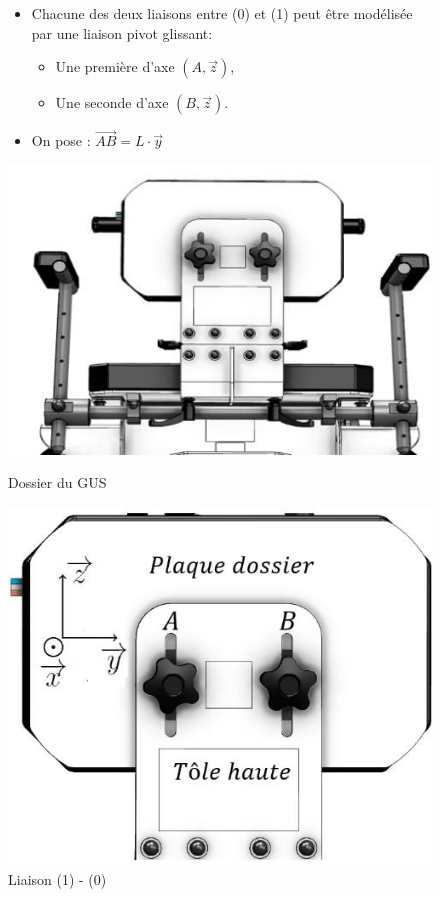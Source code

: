 \begin{figure}[ht!]
\begin{minipage}{0.55\linewidth}
\begin{itemize}
 \item Chacune des deux liaisons entre (0) et (1) peut être modélisée par une liaison pivot glissant:
 \begin{itemize}
  \item Une première d'axe $(A,\vec{z})$,
  \item Une seconde d'axe $(B,\vec{z})$.
  \end{itemize}
 \item On pose : $\overrightarrow{AB}=L\cdot \vec{y}$
\end{itemize}
\end{minipage}\hfill
\begin{minipage}{0.55\linewidth}
\centering\includegraphics[width=0.8\linewidth]{img/fig12}
\caption{\label{fig12}Dossier du GUS}
\centering\includegraphics[width=0.8\linewidth]{img/fig13}
\caption{\label{fig13}Liaison (1) - (0)}
\end{minipage}
\end{figure}


